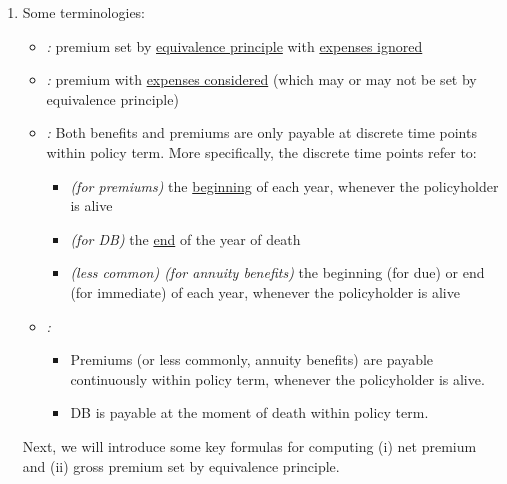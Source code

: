 \begin{enumerate}
Then, the  suggests that the premium is set such
that:
\begin{itemize}
\item \emph{(ignoring expenses)} \(\expv{L_0^n}=0\), i.e., \(\epvt{0}{\text{premiums}}=\epvt{0}{\text{benefits}}\).
\item \emph{(considering expenses)} \(\expv{L_0^g}=0\), i.e., 
\(\epvt{0}{\text{premiums}}=\epvt{0}{\text{benefits}}+\epvt{0}{\text{expenses}}\).
\end{itemize}
Here \(\epvt{0}{\cdot}\) refers to the time-0 EPV.

\item Some terminologies:
\begin{itemize}
\item \emph{:} premium set by \underline{equivalence
principle} with \underline{expenses ignored}
\item \emph{:} premium with \underline{expenses considered}
(which may or may not be set by equivalence principle)
\item \emph{:} Both benefits and premiums are only payable
at discrete time points within policy term. More specifically, the discrete
time points refer to:
\begin{itemize}
\item \emph{(for premiums)} the \underline{beginning} of each year, whenever the policyholder is alive
\item \emph{(for DB)} the \underline{end} of the year of death
\item \emph{(less common) (for annuity benefits)} the beginning (for due) or
end (for immediate) of each year, whenever the policyholder is alive
\end{itemize}
\item \emph{:}
\begin{itemize}
\item Premiums (or less commonly, annuity benefits) are payable continuously
within policy term, whenever the policyholder is alive.
\item DB is payable at the moment of death within policy term.
\end{itemize}
\begin{center}
\end{center}
\end{itemize}
Next, we will introduce some key formulas for computing (i) net premium and
(ii) gross premium set by equivalence principle.


\end{enumerate}
